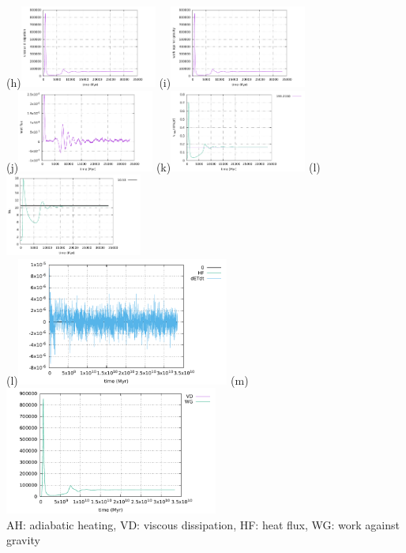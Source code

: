 \begin{center}
(h)\includegraphics[width=4.5cm]{python_codes/fieldstone_24/BA_105/viscous_dissipation}
(i)\includegraphics[width=4.5cm]{python_codes/fieldstone_24/BA_105/work_grav}\\
(j)\includegraphics[width=4.5cm]{python_codes/fieldstone_24/BA_105/heat_flux}
(k)\includegraphics[width=4.5cm]{python_codes/fieldstone_24/BA_105/vrms}
(l)\includegraphics[width=4.5cm]{python_codes/fieldstone_24/BA_105/Nu}\\
(l)\includegraphics[width=7cm]{python_codes/fieldstone_24/BA_105/conservation1}
(m)\includegraphics[width=7cm]{python_codes/fieldstone_24/BA_105/conservation2}\\
AH: adiabatic heating, VD: viscous dissipation, HF: heat flux, WG: work against gravity
\end{center}


